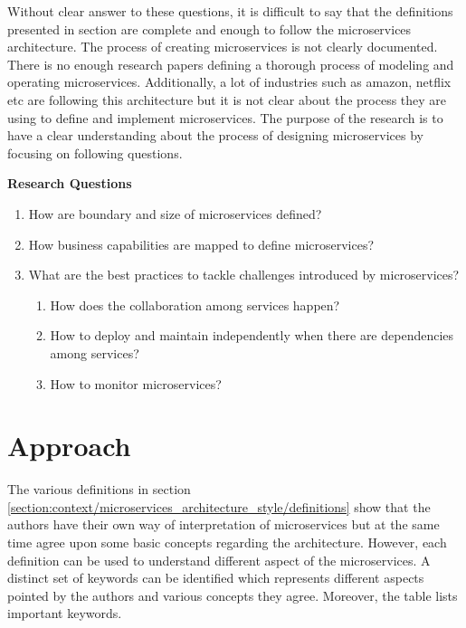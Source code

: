 Without clear answer to these questions, it is difficult to say that the definitions presented in section are complete and enough to follow the microservices architecture. The process of creating microservices is not clearly documented. There is no enough research papers defining a thorough process of modeling and operating microservices. Additionally, a lot of industries such as amazon, netflix etc are following this architecture but it is not clear about the process they are using to define and implement microservices. The purpose of the research is to have a clear understanding about the process of designing microservices by focusing on following questions.
\begin{shaded}
\textbf{Research Questions}\label{list:introduction/research_questions}
\end{shaded}
\begin{enumerate}
\item How are boundary and size of microservices defined?
\item How business capabilities are mapped to define microservices?
\item What are the best practices to tackle challenges introduced by microservices?
    \begin{enumerate}
    \item How does the collaboration among services happen?
    \item How to deploy and maintain independently when there are dependencies among services?
    \item How to monitor microservices?
    \end{enumerate}
\end{enumerate}
\section{Approach}\label{section:context/approach}
The various definitions in section \ref{section:context/microservices_architecture_style/definitions} show that the authors have their own way of interpretation of microservices but at the same time agree upon some basic concepts regarding the architecture. However, each definition can be used to understand different aspect of the microservices. A distinct set of keywords can be identified which represents different aspects pointed by the authors and various concepts they agree. Moreover, the table lists important keywords.

